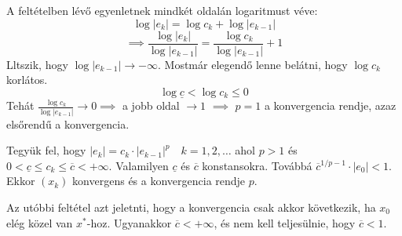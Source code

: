 A feltételben lévő egyenletnek mindkét oldalán logaritmust véve:
\begin{equation*}
    \log \lvert e_{k} \rvert  = \log c_{k} + \log \lvert e_{k-1} \rvert 
\end{equation*}
\begin{equation*}
    \implies \frac{\log \lvert  e_{k} \rvert }{\log \lvert e_{k-1} \rvert } = \frac{\log c_{k}}{\log \lvert e_{k-1} \rvert } + 1
\end{equation*}
Lltszik, hogy $\log \lvert e_{k-1} \rvert \to - \infty$. Mostmár elegendő lenne belátni, hogy $\log c_{k}$ korlátos.
\begin{equation*}
    \log \underline c < \log c_{k} \leq 0
\end{equation*}
Tehát $\frac{\log c_{k}}{\log \lvert e_{k-1} \rvert } \to 0 \implies$ a jobb oldal $\to 1$ $\implies$ $p = 1$ a konvergencia rendje, azaz elsőrendű a konvergencia.

\begin{allitas}
    Tegyük fel, hogy $\lvert e_{k} \rvert = c_{k} \cdot \lvert e_{k-1} \rvert^{p} \quad k = 1, 2, \dots$ ahol $p > 1$ és $0 < \underline{c} \leq c_{k} \leq \overline c < + \infty$. Valamilyen $\underline{c}$ és $\overline c$ konstansokra. Továbbá $\overline{c}^{1/p-1} \cdot \lvert e_{0} \rvert < 1$. Ekkor $(x_{k})$ konvergens és a konvergencia rendje $p$.
\end{allitas}

\begin{megj}
    Az utóbbi feltétel azt jeletnti, hogy a konvergencia csak akkor következik, ha $x_{0}$ elég közel van $x^{*}$-hoz. Ugyanakkor $\overline c < + \infty$, és nem kell teljesülnie, hogy $\overline c < 1$.
\end{megj}




